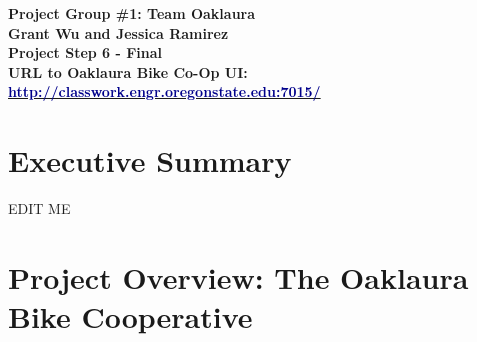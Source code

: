 \documentclass{article}
\begin{document}
\begin{center}
\large\textcolor{primarycolor}{\textbf{Project Group \#1: Team Oaklaura}}\\[0.3cm]
\large\textbf{Grant Wu and Jessica Ramirez}\\[0.3cm]
\huge\textbf{Project Step 6 - Final}\\[0.5cm]

\large\textbf{URL to Oaklaura Bike Co-Op UI:}\\[0.5cm]
\large\href{http://classwork.engr.oregonstate.edu:7015/}{\textcolor{darkblue}{\textbf{http://classwork.engr.oregonstate.edu:7015/}}}\\[1.25cm]
\end{center}
\section{Executive Summary}
\begin{tcolorbox}[colback=secondarycolor, colframe=primarycolor, title=\textbf{Reflection on Major Changes Throughout Project}]
EDIT ME
\end{tcolorbox}

\section{Project Overview: The Oaklaura Bike Cooperative}
\end{document}
